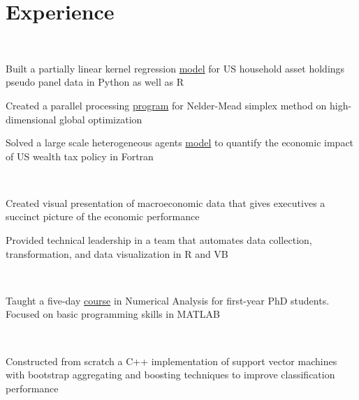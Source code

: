 \documentclass[]{hieudo-build}
\begin{document}
\begin{minipage}[t]{0.65\textwidth} 

\section{Experience}
 \\
\vspace{0.9em}
\begin{tightemize}
\item Built a partially linear kernel regression \href{https://bit.ly/2PiI9SY}{model} for US household asset holdings pseudo panel data in Python as well as R
\item Created a parallel processing \href{https://bit.ly/2PRfkhp}{program} for Nelder-Mead simplex method on high-dimensional global optimization 
\item Solved a large scale heterogeneous agents \href{https://goo.gl/hVyn6P}{model} to quantify the economic impact of US wealth tax policy in Fortran
\end{tightemize}
\sectionsep

 \\
\begin{tightemize}
\item Created visual presentation of  macroeconomic data that gives executives a succinct picture of the economic performance
\item Provided technical leadership in a team that automates data collection, transformation, and data visualization in R and VB
\end{tightemize}
\sectionsep

 \\
\begin{tightemize}
\item Taught a five-day \href{https://libinruan.com/teaching-2/}{course} in Numerical Analysis for first-year PhD students. Focused on basic programming skills in MATLAB
\end{tightemize}
\sectionsep

 \\
\begin{tightemize}
\item Constructed from scratch a C++ implementation of support vector machines  with bootstrap aggregating and boosting techniques to improve classification performance  
\end{tightemize}
\sectionsep


\end{minipage}
\end{document}
